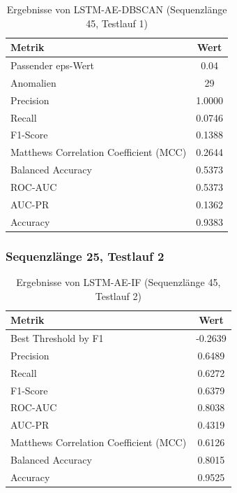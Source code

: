 \documentclass[a4paper,12pt]{article}
\begin{document}
\begin{table}[H]
	\centering
	\caption{Ergebnisse von LSTM-AE-DBSCAN (Sequenzlänge 45, Testlauf 1)}
	\begin{tabular}{lc}
		\hline
		Metrik & Wert \\
		\hline
		Passender eps-Wert & 0.04 \\
		Anomalien & 29 \\
		Precision & 1.0000 \\
		Recall & 0.0746 \\
		F1-Score & 0.1388 \\
		Matthews Correlation Coefficient (MCC) & 0.2644 \\
		Balanced Accuracy & 0.5373 \\
		ROC-AUC & 0.5373 \\
		AUC-PR & 0.1362 \\
		Accuracy & 0.9383 \\
		\hline
	\end{tabular}
\end{table}


\subsubsection{Sequenzlänge 25, Testlauf 2}
\begin{table}[H]
	\centering
	\caption{Ergebnisse von LSTM-AE-IF (Sequenzlänge 45, Testlauf 2)}
	\begin{tabular}{lc}
		\hline
		Metrik & Wert \\
		\hline
		Best Threshold by F1 & -0.2639 \\
		Precision & 0.6489 \\
		Recall & 0.6272 \\
		F1-Score & 0.6379 \\
		ROC-AUC & 0.8038 \\
		AUC-PR & 0.4319 \\
		Matthews Correlation Coefficient (MCC) & 0.6126 \\
		Balanced Accuracy & 0.8015 \\
		Accuracy & 0.9525 \\
		\hline
	\end{tabular}
\end{table}
\end{document}
